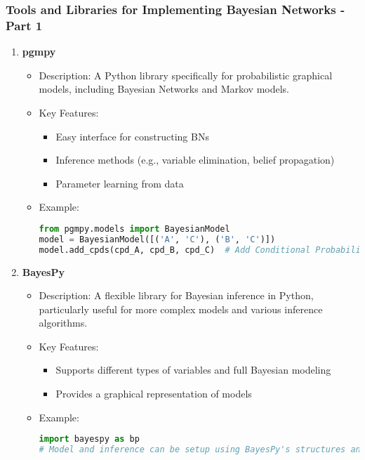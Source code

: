 \documentclass[aspectratio=169]{beamer}
\begin{document}
\begin{frame}[fragile]
    \frametitle{Tools and Libraries for Implementing Bayesian Networks - Part 1}
    \begin{enumerate}
        \item \textbf{pgmpy}
        \begin{itemize}
            \item Description: A Python library specifically for probabilistic graphical models, including Bayesian Networks and Markov models.
            \item Key Features:
            \begin{itemize}
                \item Easy interface for constructing BNs
                \item Inference methods (e.g., variable elimination, belief propagation)
                \item Parameter learning from data
            \end{itemize}
            \item Example:
            \begin{lstlisting}[language=Python]
from pgmpy.models import BayesianModel
model = BayesianModel([('A', 'C'), ('B', 'C')])
model.add_cpds(cpd_A, cpd_B, cpd_C)  # Add Conditional Probability Distributions
            \end{lstlisting}
        \end{itemize}
        
        \item \textbf{BayesPy}
        \begin{itemize}
            \item Description: A flexible library for Bayesian inference in Python, particularly useful for more complex models and various inference algorithms.
            \item Key Features:
            \begin{itemize}
                \item Supports different types of variables and full Bayesian modeling
                \item Provides a graphical representation of models
            \end{itemize}
            \item Example:
            \begin{lstlisting}[language=Python]
import bayespy as bp
# Model and inference can be setup using BayesPy's structures and updates
            \end{lstlisting}
        \end{itemize}
    \end{enumerate}
\end{frame}
\end{document}
